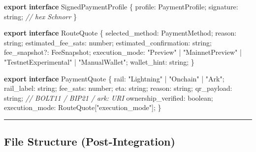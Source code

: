 \documentclass[
]{article}
\newenvironment{Shaded}{}{}
\newcommand{\CommentTok}[1]{\textcolor[rgb]{0.38,0.63,0.69}{\textit{#1}}}
\newcommand{\DataTypeTok}[1]{\textcolor[rgb]{0.56,0.13,0.00}{#1}}
\newcommand{\ImportTok}[1]{\textcolor[rgb]{0.00,0.50,0.00}{\textbf{#1}}}
\newcommand{\KeywordTok}[1]{\textcolor[rgb]{0.00,0.44,0.13}{\textbf{#1}}}
\newcommand{\NormalTok}[1]{#1}
\newcommand{\OperatorTok}[1]{\textcolor[rgb]{0.40,0.40,0.40}{#1}}
\newcommand{\StringTok}[1]{\textcolor[rgb]{0.25,0.44,0.63}{#1}}
\begin{document}
\begin{Shaded}
\begin{Highlighting}[]
\ImportTok{export} \KeywordTok{interface}\NormalTok{ SignedPaymentProfile \{}
\NormalTok{  profile}\OperatorTok{:}\NormalTok{ PaymentProfile}\OperatorTok{;}
\NormalTok{  signature}\OperatorTok{:} \DataTypeTok{string}\OperatorTok{;} \CommentTok{// hex Schnorr}
\NormalTok{\}}

\ImportTok{export} \KeywordTok{interface}\NormalTok{ RouteQuote \{}
\NormalTok{  selected\_method}\OperatorTok{:}\NormalTok{ PaymentMethod}\OperatorTok{;}
\NormalTok{  reason}\OperatorTok{:} \DataTypeTok{string}\OperatorTok{;}
\NormalTok{  estimated\_fee\_sats}\OperatorTok{:} \DataTypeTok{number}\OperatorTok{;}
\NormalTok{  estimated\_confirmation}\OperatorTok{:} \DataTypeTok{string}\OperatorTok{;}
\NormalTok{  fee\_snapshot}\OperatorTok{?:}\NormalTok{ FeeSnapshot}\OperatorTok{;}
\NormalTok{  execution\_mode}\OperatorTok{:}
    \StringTok{"Preview"} \OperatorTok{|} \StringTok{"MainnetPreview"} \OperatorTok{|} \StringTok{"TestnetExperimental"} \OperatorTok{|} \StringTok{"ManualWallet"}\OperatorTok{;}
\NormalTok{  wallet\_hint}\OperatorTok{:} \DataTypeTok{string}\OperatorTok{;}
\NormalTok{\}}

\ImportTok{export} \KeywordTok{interface}\NormalTok{ PaymentQuote \{}
\NormalTok{  rail}\OperatorTok{:} \StringTok{"Lightning"} \OperatorTok{|} \StringTok{"Onchain"} \OperatorTok{|} \StringTok{"Ark"}\OperatorTok{;}
\NormalTok{  rail\_label}\OperatorTok{:} \DataTypeTok{string}\OperatorTok{;}
\NormalTok{  fee\_sats}\OperatorTok{:} \DataTypeTok{number}\OperatorTok{;}
\NormalTok{  eta}\OperatorTok{:} \DataTypeTok{string}\OperatorTok{;}
\NormalTok{  reason}\OperatorTok{:} \DataTypeTok{string}\OperatorTok{;}
\NormalTok{  qr\_payload}\OperatorTok{:} \DataTypeTok{string}\OperatorTok{;} \CommentTok{// BOLT11 / BIP21 / ark: URI}
\NormalTok{  ownership\_verified}\OperatorTok{:} \DataTypeTok{boolean}\OperatorTok{;}
\NormalTok{  execution\_mode}\OperatorTok{:}\NormalTok{ RouteQuote[}\StringTok{"execution\_mode"}\NormalTok{]}\OperatorTok{;}
\NormalTok{\}}
\end{Highlighting}
\end{Shaded}

\begin{center}\rule{0.5\linewidth}{0.5pt}\end{center}

\hypertarget{file-structure-post-integration}{%
\subsection{File Structure
(Post-Integration)}\label{file-structure-post-integration}}
\end{document}
